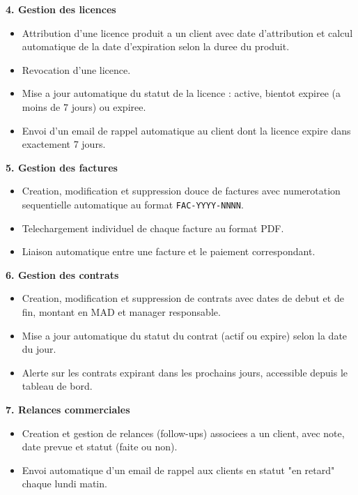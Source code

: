\documentclass[12pt, a4paper]{report}
\begin{document}
\vspace{0.3cm}
\textbf{4. Gestion des licences}

\begin{itemize}
  \item Attribution d'une licence produit a un client avec date d'attribution
        et calcul automatique de la date d'expiration selon la duree du produit.
  \item Revocation d'une licence.
  \item Mise a jour automatique du statut de la licence : active, bientot
        expiree (a moins de 7 jours) ou expiree.
  \item Envoi d'un email de rappel automatique au client dont la licence expire
        dans exactement 7 jours.
\end{itemize}

\vspace{0.3cm}
\textbf{5. Gestion des factures}

\begin{itemize}
  \item Creation, modification et suppression douce de factures avec
        numerotation sequentielle automatique au format \texttt{FAC-YYYY-NNNN}.
  \item Telechargement individuel de chaque facture au format PDF.
  \item Liaison automatique entre une facture et le paiement correspondant.
\end{itemize}

\vspace{0.3cm}
\textbf{6. Gestion des contrats}

\begin{itemize}
  \item Creation, modification et suppression de contrats avec dates de debut
        et de fin, montant en MAD et manager responsable.
  \item Mise a jour automatique du statut du contrat (actif ou expire) selon
        la date du jour.
  \item Alerte sur les contrats expirant dans les prochains jours, accessible
        depuis le tableau de bord.
\end{itemize}

\vspace{0.3cm}
\textbf{7. Relances commerciales}

\begin{itemize}
  \item Creation et gestion de relances (follow-ups) associees a un client,
        avec note, date prevue et statut (faite ou non).
  \item Envoi automatique d'un email de rappel aux clients en statut "en retard"
        chaque lundi matin.
\end{itemize}
\end{document}
